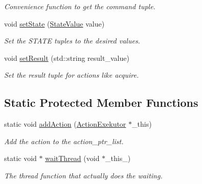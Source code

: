 \begin{DoxyCompactItemize}
\begin{DoxyCompactList}\small\item\em \-Convenience function to get the command tuple. \end{DoxyCompactList}\item 
void \hyperlink{classexekutor_1_1ActionExekutor_a47056dd4cb829acdbfd6a43378d3f332}{set\-State} (\hyperlink{namespaceexekutor_a82e43e24945d434a81cc5d50282a0e6d}{\-State\-Value} value)
\begin{DoxyCompactList}\small\item\em \-Set the \-S\-T\-A\-T\-E tuples to the desired values. \end{DoxyCompactList}\item 
void \hyperlink{classexekutor_1_1ActionExekutor_a3ae8766878e990bca14bf45761a46bf2}{set\-Result} (std\-::string result\-\_\-value)
\begin{DoxyCompactList}\small\item\em \-Set the result tuple for actions like acquire. \end{DoxyCompactList}\end{DoxyCompactItemize}
\subsection*{\-Static \-Protected \-Member \-Functions}
\begin{DoxyCompactItemize}
\item 
static void \hyperlink{classexekutor_1_1ActionExekutor_ad2beec0ac18fbdaccf66fea31dbc9f69}{add\-Action} (\hyperlink{classexekutor_1_1ActionExekutor}{\-Action\-Exekutor} $\ast$\-\_\-this)
\begin{DoxyCompactList}\small\item\em \-Add the action to the action\-\_\-ptr\-\_\-list. \end{DoxyCompactList}\item 
static void $\ast$ \hyperlink{classexekutor_1_1ActionExekutor_a09a4d87243b3e4c36daf1ea43ee67196}{wait\-Thread} (void $\ast$\-\_\-this\-\_\-)
\begin{DoxyCompactList}\small\item\em \-The thread function that actually does the waiting. \end{DoxyCompactList}\end{DoxyCompactItemize}
